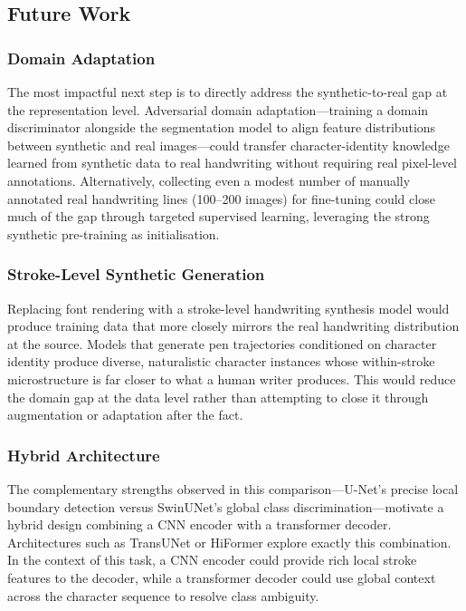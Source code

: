 \documentclass[a4paper,11pt]{article}
\begin{document}
\subsection{Future Work}

\subsubsection{Domain Adaptation}

The most impactful next step is to directly address the synthetic-to-real gap at the
representation level. Adversarial domain adaptation---training a domain discriminator
alongside the segmentation model to align feature distributions between synthetic and real
images---could transfer character-identity knowledge learned from synthetic data to real
handwriting without requiring real pixel-level annotations. Alternatively, collecting even
a modest number of manually annotated real handwriting lines (100--200 images) for
fine-tuning could close much of the gap through targeted supervised learning, leveraging
the strong synthetic pre-training as initialisation.

\subsubsection{Stroke-Level Synthetic Generation}

Replacing font rendering with a stroke-level handwriting synthesis model would produce
training data that more closely mirrors the real handwriting distribution at the source.
Models that generate pen trajectories conditioned on character identity produce diverse,
naturalistic character instances whose within-stroke microstructure is far closer to what
a human writer produces. This would reduce the domain gap at the data level rather than
attempting to close it through augmentation or adaptation after the fact.

\subsubsection{Hybrid Architecture}

The complementary strengths observed in this comparison---U-Net's precise local boundary
detection versus SwinUNet's global class discrimination---motivate a hybrid design
combining a CNN encoder with a transformer decoder. Architectures such as TransUNet or
HiFormer explore exactly this combination. In the context of this task, a CNN encoder
could provide rich local stroke features to the decoder, while a transformer decoder could
use global context across the character sequence to resolve class ambiguity.
\end{document}

